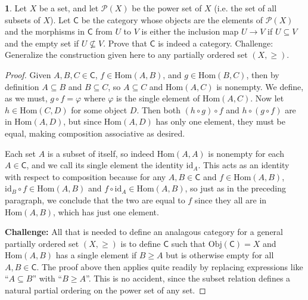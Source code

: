 \documentclass[12pt]{article}
\theoremstyle{definition}
\newtheorem{ex}{}
\begin{document}
\begin{ex}
	Let $X$ be a set, and let $\mathcal{P}(X)$ be the power set of $X$ (i.e. the set of all subsets of $X$).
	Let $\mathsf{C}$ be the category whose objects are the elements of $\mathcal{P}(X)$ and the morphisms in $\mathsf{C}$ from $U$ to $V$ is either the inclusion map $U \to V$ if $U \subseteq V$ and the empty set if $U \not\subseteq V$.
	Prove that $\mathsf{C}$ is indeed a category.
	Challenge: Generalize the construction given here to any partially ordered set $(X, \geq)$.
\end{ex}
\begin{proof}
	Given $A, B, C \in \mathsf{C}$, $f \in \mathrm{Hom}(A, B)$, and $g \in \mathrm{Hom}(B, C)$, then by definition $A \subseteq B$ and $B \subseteq C$, so $A \subseteq C$ and $\mathrm{Hom}(A, C)$ is nonempty.
	We define, as we must, $g \circ f = \varphi$ where $\varphi$ is the single element of $\mathrm{Hom}(A, C)$.
	Now let $h \in \mathrm{Hom}(C, D)$ for some object $D$.
	Then both $(h \circ g) \circ f$ and $h \circ (g \circ f)$ are in $\mathrm{Hom}(A, D)$, but since $\mathrm{Hom}(A, D)$ has only one element, they must be equal, making composition associative as desired.

	Each set $A$ is a subset of itself, so indeed $\mathrm{Hom}(A, A)$ is nonempty for each $A \in \mathsf{C}$, and we call its single element the identity $\mathrm{id}_A$.
	This acts as an identity with respect to composition because for any $A, B \in \mathsf{C}$ and $f \in \mathrm{Hom}(A, B)$, $\mathrm{id}_B \circ f \in \mathrm{Hom}(A, B)$ and $f \circ \mathrm{id}_A \in \mathrm{Hom}(A, B)$, so just as in the preceding paragraph, we conclude that the two are equal to $f$ since they all are in $\mathrm{Hom}(A, B)$, which has just one element.

	\textbf{Challenge:} All that is needed to define an analagous category for a general partially ordered set $(X, \geq)$ is to define $\mathsf{C}$ such that $\mathrm{Obj}(\mathsf{C}) = X$ and $\mathrm{Hom}(A, B)$ has a single element if $B \geq A$ but is otherwise empty for all $A, B \in \mathsf{C}$.
	The proof above then applies quite readily by replacing expressions like ``$A \subseteq B$'' with ``$B \geq A$''.
	This is no accident, since the subset relation defines a natural partial ordering on the power set of any set.
\end{proof}
\end{document}
